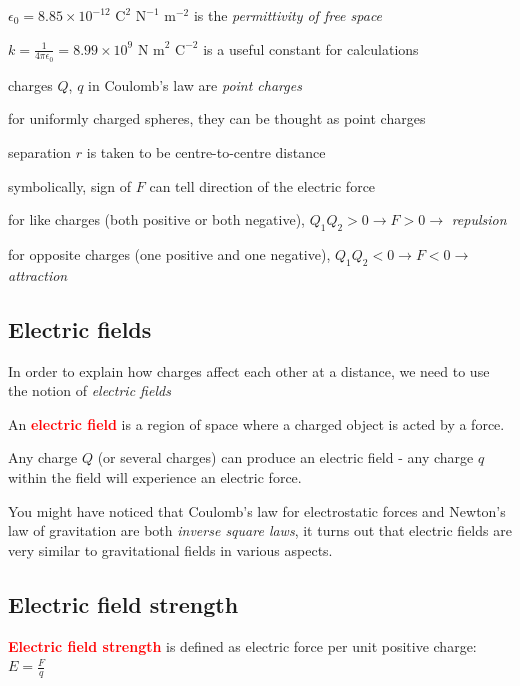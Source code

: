 \documentclass[a4paper,12pt]{book}
\newcommand{\cmt}{}
\newenvironment{ilight}
  {\centering
  	\vspace*{6pt}
  	\begin{tcolorbox}[colframe=Gray,colback=LightGrey!15]
  \setlength{\baselineskip}{\baselineskip}%
  }
  {\end{tcolorbox}\vspace*{-4pt}}
\newcommand{\keypoint}[1]{\textbf{\textcolor{red}{#1}}}
\newcommand{\rcyskip}{\vspace{4pt}}
\newcommand{\ec}{4\pi\epsilon_0}
\newcommand{\ra}{\rightarrow}
\newcommand{\tcbhighmath}[1]{\boxed{#1}}
\newcommand{\keypoint}[1]{\textbf{\textcolor{red}{#1}}}
\newcommand{\cmt}{}
\begin{document}
$\epsilon_0 = 8.85 \times 10^{-12} \text{ C}^2 \text{ N}^{-1} \text{ m}^{-2}$ is the \emph{permittivity of free space}

$k = \frac{1}{\ec} = 8.99 \times 10^9 \text{ N m}^2 \text{ C}^{-2}$ is a useful constant for calculations

\cmt charges $Q$, $q$ in Coulomb's law are \emph{point charges}

\cmt for uniformly charged spheres, they can be thought as point charges

separation $r$ is taken to be centre-to-centre distance

\cmt symbolically, sign of $F$ can tell direction of the electric force

for like charges (both positive or both negative), $Q_1Q_2>0 \ra F>0 \ra$  \emph{repulsion}

for opposite charges (one positive and one negative), $Q_1Q_2<0 \ra F<0 \ra$  \emph{attraction}

\subsection{Electric fields}

In order to explain how charges affect each other at a distance, we need to use the notion of \emph{electric fields}

\begin{ilight}
	An \keypoint{electric field} is a region of space where a charged object is acted by a force.
\end{ilight}

Any charge $Q$ (or several charges) can produce an electric field - any charge $q$ within the field will experience an electric force.

\vspace*{\baselineskip}

You might have noticed that Coulomb's law for electrostatic forces and Newton's law of gravitation are both \emph{inverse square laws}, it turns out that electric fields are very similar to gravitational fields in various aspects.

\subsection{Electric field strength}

\rcyskip

\begin{ilight}
	\keypoint{Electric field strength} is defined as electric force per unit positive charge: $\tcbhighmath{E=\frac{F}{q}}$
\end{ilight}
\end{document}

